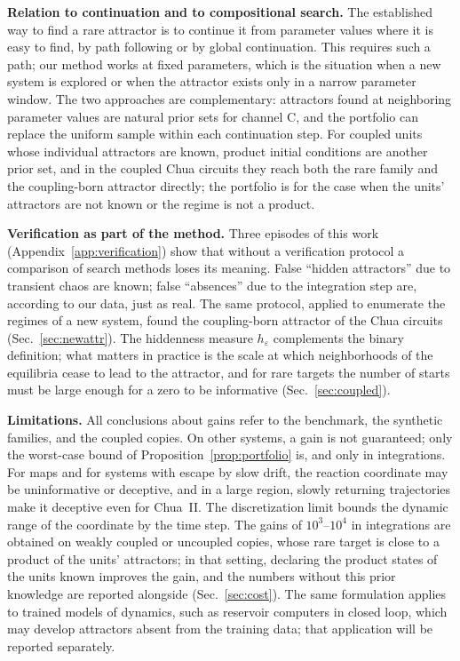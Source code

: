 \textbf{Relation to continuation and to compositional search.} The established way to find a rare attractor is to continue it from parameter values where it is easy to find, by path following or by global continuation.\cite{Brzeski2017,Datseris2023Framework,Datseris2026Global} This requires such a path; our method works at fixed parameters, which is the situation when a new system is explored or when the attractor exists only in a narrow parameter window. The two approaches are complementary: attractors found at neighboring parameter values are natural prior sets for channel C, and the portfolio can replace the uniform sample within each continuation step. For coupled units whose individual attractors are known, product initial conditions are another prior set, and in the coupled Chua circuits they reach both the rare family and the coupling-born attractor directly; the portfolio is for the case when the units' attractors are not known or the regime is not a product.

\textbf{Verification as part of the method.} Three episodes of this work (Appendix~\ref{app:verification}) show that without a verification protocol a comparison of search methods loses its meaning. False ``hidden attractors'' due to transient chaos are known;\cite{SprottMunmuangsaen2018Comment,Danca2016Transient} false ``absences'' due to the integration step are, according to our data, just as real. The same protocol, applied to enumerate the regimes of a new system, found the coupling-born attractor of the Chua circuits (Sec.~\ref{sec:newattr}). The hiddenness measure $h_\varepsilon$ complements the binary definition; what matters in practice is the scale at which neighborhoods of the equilibria cease to lead to the attractor, and for rare targets the number of starts must be large enough for a zero to be informative (Sec.~\ref{sec:coupled}).

\textbf{Limitations.} All conclusions about gains refer to the benchmark, the synthetic families, and the coupled copies. On other systems, a gain is not guaranteed; only the worst-case bound of Proposition~\ref{prop:portfolio} is, and only in integrations. For maps and for systems with escape by slow drift, the reaction coordinate may be uninformative or deceptive, and in a large region, slowly returning trajectories make it deceptive even for Chua~II. The discretization limit bounds the dynamic range of the coordinate by the time step. The gains of $10^3$--$10^4$ in integrations are obtained on weakly coupled or uncoupled copies, whose rare target is close to a product of the units' attractors; in that setting, declaring the product states of the units known improves the gain, and the numbers without this prior knowledge are reported alongside (Sec.~\ref{sec:cost}). The same formulation applies to trained models of dynamics, such as reservoir computers in closed loop,\cite{Pathak2017Chaos,LuHuntOtt2018} which may develop attractors absent from the training data;\cite{HaluszczynskiRath2019,HerteuxRath2020,Flynn2021,Kabayama2025PseudoLorenz} that application will be reported separately.
